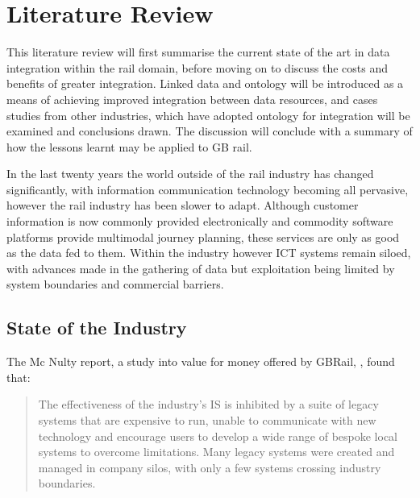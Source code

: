 \chapter{Literature Review}\label{ch:litreview}
This literature review will first summarise the current state of the art in data integration within the rail domain, before moving on to discuss the costs and benefits of greater integration. Linked data and ontology will be introduced as a means of achieving improved integration between data resources, and cases studies from other industries, which have adopted ontology for integration will be examined and conclusions drawn. The discussion will conclude with a summary of how the lessons learnt may be applied to GB rail.

In the last twenty years the world outside of the rail industry has changed significantly, with information communication technology becoming all pervasive, however the rail industry has been slower to adapt. Although customer information is now commonly provided electronically and commodity software platforms provide multimodal journey planning, these services are only as good as the data fed to them. Within the industry however ICT systems remain siloed, with advances made in the gathering of data but exploitation being limited by system boundaries and commercial barriers. 

\section{State of the Industry}
\label{state}

The Mc Nulty report, a study into value for money offered by GBRail, \citep{DepartmentforTransport2011}, found that:
\begin{quote}
    The effectiveness of the industry’s IS is inhibited by a suite of legacy systems that are expensive to run, unable to communicate with new technology and encourage users to develop a wide range of bespoke local systems to overcome limitations. Many legacy systems were created and managed in company silos, with only a few systems crossing industry boundaries.
\end{quote}

